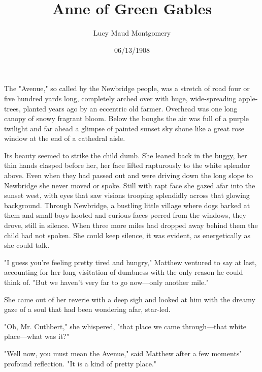 \documentclass[a4paper]{article}
\title{Anne of Green Gables}
\author{Lucy Maud Montgomery}
\date{06/13/1908}
\begin{document}
\maketitle
The "Avenue," so called by the Newbridge people, was a stretch of road four or five hundred yards long, completely arched over with huge, wide-spreading apple-trees, planted years ago by an eccentric old farmer. Overhead was one long canopy of snowy fragrant bloom. Below the boughs the air was full of a purple twilight and far ahead a glimpse of painted sunset sky shone like a great rose window at the end of a cathedral aisle.



Its beauty seemed to strike the child dumb. She leaned back in the buggy, her thin hands clasped before her, her face lifted rapturously to the white splendor above. Even when they had passed out and were driving down the long slope to Newbridge she never moved or spoke. Still with rapt face she gazed afar into the sunset west, with eyes that saw visions trooping splendidly across that glowing background. Through Newbridge, a bustling little village where dogs barked at them and small boys hooted and curious faces peered from the windows, they drove, still in silence. When three more miles had dropped away behind them the child had not spoken. She could keep silence, it was evident, as energetically as she could talk.

                                   "I guess you're feeling pretty tired and hungry," Matthew ventured to say at last, accounting for her long visitation of dumbness with the only reason he could think of. "But we haven't very far to go now---only another mile."

She came out of her reverie                            with a deep sigh and looked at him with the dreamy gaze of a soul that had been                     wondering afar, star-led.

"Oh, Mr. Cuthbert," she whispered, "that place we came through---that white place---what was it?"

"Well now, you must mean the Avenue," said Matthew after a few moments' profound reflection. "It is a kind of pretty place."
\end{document}
